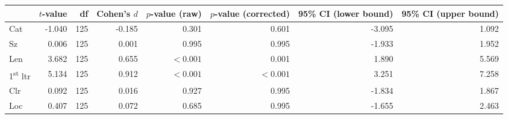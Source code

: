 \begin{tabular}{lrrrrrrr}
\toprule
 & $t$-value & df & Cohen's $d$ & $p$-value (raw) & $p$-value (corrected) & 95\% CI (lower bound) & 95\% CI (upper bound) \\
\midrule
 Cat & -1.040 & 125 & -0.185 & 0.301 & 0.601 & -3.095 & 1.092 \\
 Sz & 0.006 & 125 & 0.001 & 0.995 & 0.995 & -1.933 & 1.952 \\
\rowcolor[HTML]{fffee3} Len & 3.682 & 125 & 0.655 & $< 0.001$ & 0.001 & 1.890 & 5.569 \\
\rowcolor[HTML]{fffee3} 1\textsuperscript{st} ltr & 5.134 & 125 & 0.912 & $< 0.001$ & $< 0.001$ & 3.251 & 7.258 \\
 Clr & 0.092 & 125 & 0.016 & 0.927 & 0.995 & -1.834 & 1.867 \\
 Loc & 0.407 & 125 & 0.072 & 0.685 & 0.995 & -1.655 & 2.463 \\
\bottomrule
\end{tabular}